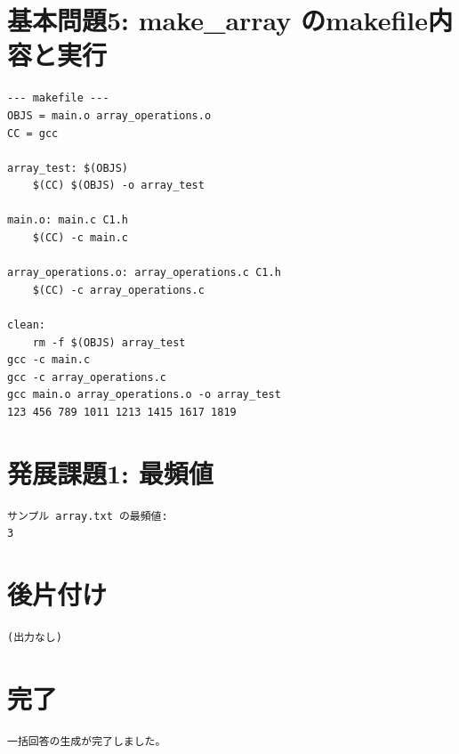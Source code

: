 \documentclass[uplatex,dvipdfmx,a4paper,11pt]{jsarticle}
\begin{document}
\section*{基本問題5: make\_array のmakefile内容と実行}
\begin{Verbatim}[fontsize=\small,frame=single]
--- makefile ---
OBJS = main.o array_operations.o
CC = gcc

array_test: $(OBJS)
	$(CC) $(OBJS) -o array_test

main.o: main.c C1.h
	$(CC) -c main.c

array_operations.o: array_operations.c C1.h
	$(CC) -c array_operations.c

clean:
	rm -f $(OBJS) array_test
gcc -c main.c
gcc -c array_operations.c
gcc main.o array_operations.o -o array_test
123 456 789 1011 1213 1415 1617 1819
\end{Verbatim}
\section*{発展課題1: 最頻値}
\begin{Verbatim}[fontsize=\small,frame=single]
サンプル array.txt の最頻値:
3
\end{Verbatim}
\section*{後片付け}
\begin{Verbatim}[fontsize=\small,frame=single]
(出力なし)
\end{Verbatim}
\section*{完了}
\begin{Verbatim}[fontsize=\small,frame=single]
一括回答の生成が完了しました。
\end{Verbatim}
\end{document}

